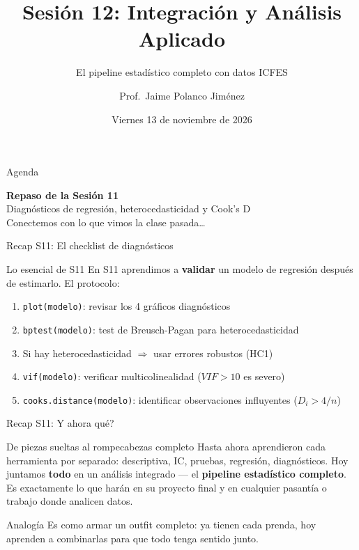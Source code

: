 \documentclass[aspectratio=169, 11pt]{beamer}
\title{Sesión 12: Integración y Análisis Aplicado}
\subtitle{El pipeline estadístico completo con datos ICFES}
\author{Prof.\ Jaime Polanco Jim\'enez}
\date{Viernes 13 de noviembre de 2026}
\begin{document}
\begin{frame}
\titlepage
\end{frame}

\begin{frame}{Agenda}
\tableofcontents
\end{frame}

\begin{frame}{}
\vfill
\centering
{\Large\textbf{Repaso de la Sesi\'on 11}}\\[1em]
{\normalsize Diagn\'osticos de regresi\'on, heterocedasticidad y Cook's D}\\[0.5em]
{\small Conectemos con lo que vimos la clase pasada\ldots}
\vfill
\end{frame}

\begin{frame}{Recap S11: El checklist de diagn\'osticos}
\begin{exampleblock}{Lo esencial de S11}
\small
En S11 aprendimos a \textbf{validar} un modelo de regresi\'on despu\'es de estimarlo. El protocolo:
\begin{enumerate}\setlength{\itemsep}{1pt}
  \item \texttt{plot(modelo)}: revisar los 4 gr\'aficos diagn\'osticos
  \item \texttt{bptest(modelo)}: test de Breusch-Pagan para heterocedasticidad
  \item Si hay heterocedasticidad $\Rightarrow$ usar errores robustos (HC1)
  \item \texttt{vif(modelo)}: verificar multicolinealidad ($VIF > 10$ es severo)
  \item \texttt{cooks.distance(modelo)}: identificar observaciones influyentes ($D_i > 4/n$)
\end{enumerate}
\end{exampleblock}
\end{frame}

\begin{frame}{Recap S11: \textquestiondown{}Y ahora qu\'e?}
\begin{block}{De piezas sueltas al rompecabezas completo}
\small
Hasta ahora aprendieron cada herramienta por separado: descriptiva, IC, pruebas, regresi\'on, diagn\'osticos. Hoy juntamos \textbf{todo} en un an\'alisis integrado --- el \textbf{pipeline estad\'istico completo}. Es exactamente lo que har\'an en su proyecto final y en cualquier pasant\'ia o trabajo donde analicen datos.
\end{block}

\begin{alertblock}{Analog\'ia}
\small
Es como armar un outfit completo: ya tienen cada prenda, hoy aprenden a combinarlas para que todo tenga sentido junto.
\end{alertblock}
\end{frame}
\end{document}
